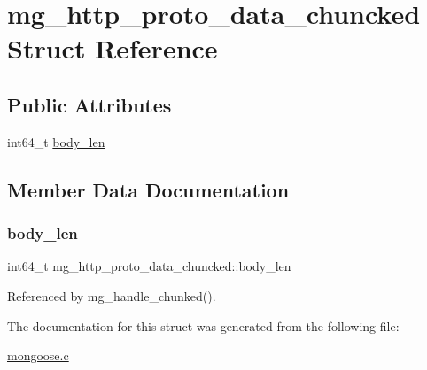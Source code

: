 \hypertarget{structmg__http__proto__data__chuncked}{}\section{mg\+\_\+http\+\_\+proto\+\_\+data\+\_\+chuncked Struct Reference}
\label{structmg__http__proto__data__chuncked}
\subsection*{Public Attributes}
\begin{DoxyCompactItemize}
\item 
int64\+\_\+t \hyperlink{structmg__http__proto__data__chuncked_aeee1125c8814977f3cd571d8db611053_aeee1125c8814977f3cd571d8db611053}{body\+\_\+len}
\end{DoxyCompactItemize}


\subsection{Member Data Documentation}
\mbox{\label{structmg__http__proto__data__chuncked_aeee1125c8814977f3cd571d8db611053_aeee1125c8814977f3cd571d8db611053}} 
\subsubsection{\texorpdfstring{body\+\_\+len}{body\_len}}
{\footnotesize\ttfamily int64\+\_\+t mg\+\_\+http\+\_\+proto\+\_\+data\+\_\+chuncked\+::body\+\_\+len}



Referenced by mg\+\_\+handle\+\_\+chunked().



The documentation for this struct was generated from the following file\+:\begin{DoxyCompactItemize}
\item 
\hyperlink{mongoose_8c}{mongoose.\+c}\end{DoxyCompactItemize}
